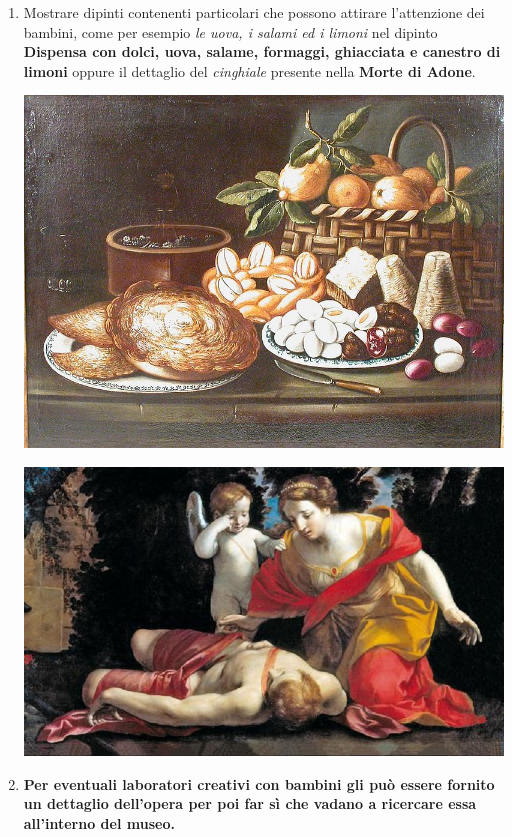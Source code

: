 \documentclass[12pt,a4paper]{article}
\begin{document}
\begin{enumerate}
	
	\item Mostrare dipinti contenenti particolari che possono attirare l'attenzione dei bambini, come per esempio \textit{le uova, i salami ed i limoni} nel dipinto \textbf{Dispensa con dolci, uova, salame, formaggi, ghiacciata e canestro di limoni} oppure il dettaglio del \textit{cinghiale} presente nella \textbf{Morte di Adone}.\par
	\begin{minipage}{\linewidth}
		\centering
		\begin{minipage}{0.4\linewidth}
			\includegraphics[]{Dispensa_natura_morta.jpg}
		\end{minipage}
		\hfill
		\begin{minipage} {0.4\linewidth}
			\includegraphics[scale=0.25]{Morte_di_Adone.jpg}
		\end{minipage}
		
	\end{minipage}
	
	\item \textbf{Per eventuali laboratori creativi con bambini gli può essere fornito un dettaglio dell'opera per poi far sì che vadano a ricercare essa all'interno del museo.}
	
	
	\end{enumerate}
\newpage
\listoffigures
\end{document}
